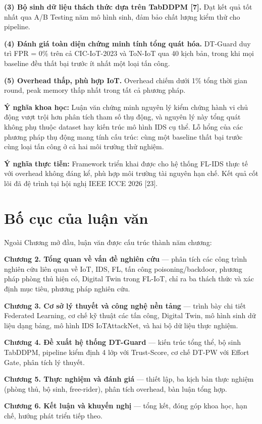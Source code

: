 \textbf{(3) Bộ sinh dữ liệu thách thức dựa trên TabDDPM {[}7{]}.} Đạt kết quả tốt nhất qua A/B Testing năm mô hình sinh, đảm bảo chất lượng kiểm thử cho pipeline.

\textbf{(4) Đánh giá toàn diện chứng minh tính tổng quát hóa.} DT-Guard duy trì FPR = 0\% trên cả CIC-IoT-2023 và ToN-IoT qua 40 kịch bản, trong khi mọi baseline đều thất bại trước ít nhất một loại tấn công.

\textbf{(5) Overhead thấp, phù hợp IoT.} Overhead chiếm dưới 1\% tổng thời gian round, peak memory thấp nhất trong tất cả phương pháp.

\textbf{Ý nghĩa khoa học:} Luận văn chứng minh nguyên lý kiểm chứng hành vi chủ động vượt trội hơn phân tích tham số thụ động, và nguyên lý này tổng quát không phụ thuộc dataset hay kiến trúc mô hình IDS cụ thể. Lỗ hổng của các phương pháp thụ động mang tính cấu trúc: cùng một baseline thất bại trước cùng loại tấn công ở cả hai môi trường thử nghiệm.

\textbf{Ý nghĩa thực tiễn:} Framework triển khai được cho hệ thống FL-IDS thực tế với overhead không đáng kể, phù hợp môi trường tài nguyên hạn chế. Kết quả cốt lõi đã đệ trình tại hội nghị IEEE ICCE 2026 {[}23{]}.

\section{Bố cục của luận văn}
Ngoài Chương mở đầu, luận văn được cấu trúc thành năm chương:

\textbf{Chương 2. Tổng quan về vấn đề nghiên cứu} --- phân tích các công trình nghiên cứu liên quan về IoT, IDS, FL, tấn công poisoning/backdoor, phương pháp phòng thủ hiện có, Digital Twin trong FL-IoT, chỉ ra ba thách thức và xác định mục tiêu, phương pháp nghiên cứu.

\textbf{Chương 3. Cơ sở lý thuyết và công nghệ nền tảng} --- trình bày chi tiết Federated Learning, cơ chế kỹ thuật các tấn công, Digital Twin, mô hình sinh dữ liệu dạng bảng, mô hình IDS IoTAttackNet, và hai bộ dữ liệu thực nghiệm.

\textbf{Chương 4. Đề xuất hệ thống DT-Guard} --- kiến trúc tổng thể, bộ sinh TabDDPM, pipeline kiểm định 4 lớp với Trust-Score, cơ chế DT-PW với Effort Gate, phân tích lý thuyết.

\textbf{Chương 5. Thực nghiệm và đánh giá} --- thiết lập, ba kịch bản thực nghiệm (phòng thủ, bộ sinh, free-rider), phân tích overhead, bàn luận tổng hợp.

\textbf{Chương 6. Kết luận và khuyến nghị} --- tổng kết, đóng góp khoa học, hạn chế, hướng phát triển tiếp theo.
